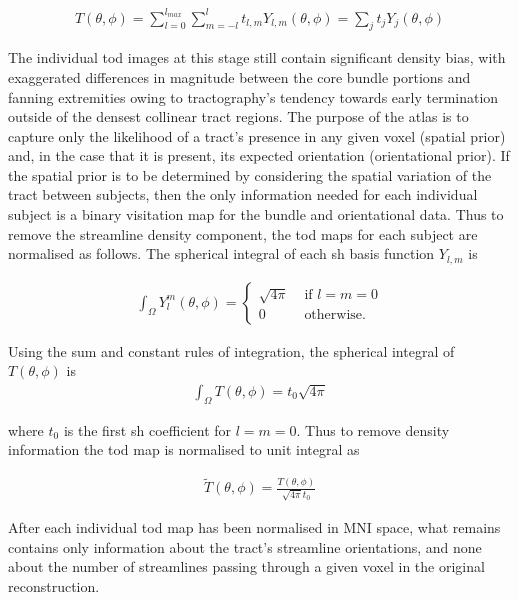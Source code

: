\begin{align}
  T(\theta, \phi) = \sum_{l=0}^{l_{max}} \sum_{m=-l}^l t_{l,m} Y_{l,m}(\theta, \phi) = \sum_j t_jY_j(\theta, \phi)
\end{align}

The individual \gls{tod} images at this stage still contain significant density bias, with exaggerated differences in magnitude between the core bundle portions and fanning extremities owing to tractography's tendency towards early termination outside of the densest collinear tract regions.\autocite{Rheault2020,Smith2013}
The purpose of the atlas is to capture only the likelihood of a tract's presence in any given voxel (spatial prior) and, in the case that it is present, its expected orientation (orientational prior).
If the spatial prior is to be determined by considering the spatial variation of the tract between subjects, then the only information needed for each individual subject is a binary visitation map for the bundle and orientational data.
Thus to remove the streamline density component, the \gls{tod} maps for each subject are normalised as follows.
The spherical integral of each \gls{sh} basis function $Y_{l,m}$ is

\begin{align}
  \int_{\Omega} Y^m_l(\theta, \phi) = \begin{cases}
   \sqrt{4\pi} & \text{ if } l=m=0\\
   0 & \text{ otherwise. }
  \end{cases}
\end{align}

Using the sum and constant rules of integration, the spherical integral of $T(\theta,\phi)$ is
\begin{align}
  \int_{\Omega} T(\theta,\phi) = t_0 \sqrt{4\pi}
\end{align}

where $t_0$ is the first \gls{sh} coefficient for $l=m=0$. Thus to remove density information the \gls{tod} map is normalised to unit integral as

\begin{align}
  \widetilde{T}(\theta, \phi) = \frac{T(\theta,\phi)}{\sqrt{4\pi} t_0}
\end{align}

After each individual \gls{tod} map has been normalised in MNI space, what remains contains only information about the tract's streamline orientations, and none about the number of streamlines passing through a given voxel in the original reconstruction.

